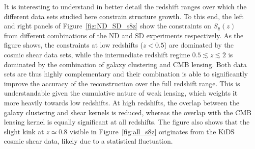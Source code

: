 \documentclass[a4paper,11pt]{article}
\newcommand{\kids}{KiDS\xspace}
\newcommand{\northd}{ND\xspace}
\newcommand{\southd}{SD\xspace}
\begin{document}
      It is interesting to understand in better detail the redshift ranges over which the different data sets studied here constrain structure growth. To this end, the left and right panels of Figure~\ref{fig:ND_SD_s8z} show the constraints on $S_8(z)$ from different combinations of the \northd and \southd experiments respectively. As the figure shows, the constraints at low redshifts ($z<0.5$) are dominated by the cosmic shear data sets, while the intermediate redshift regime $0.5\lesssim z\lesssim2$ is dominated by the combination of galaxy clustering and CMB lensing. Both data sets are thus highly complementary and their combination is able to significantly improve the accuracy of the reconstruction over the full redshift range. This is understandable given the cumulative nature of weak lensing, which weights it more heavily towards low redshifts. At high redshifts, the overlap between the galaxy clustering and shear kernels is reduced, whereas the overlap with the CMB lensing kernel is equally significant at all redshifts. The figure also shows that the slight kink at $z\simeq0.8$ visible in Figure~\ref{fig:all_s8z} originates from the \kids cosmic shear data, likely due to a statistical fluctuation.
\end{document}
